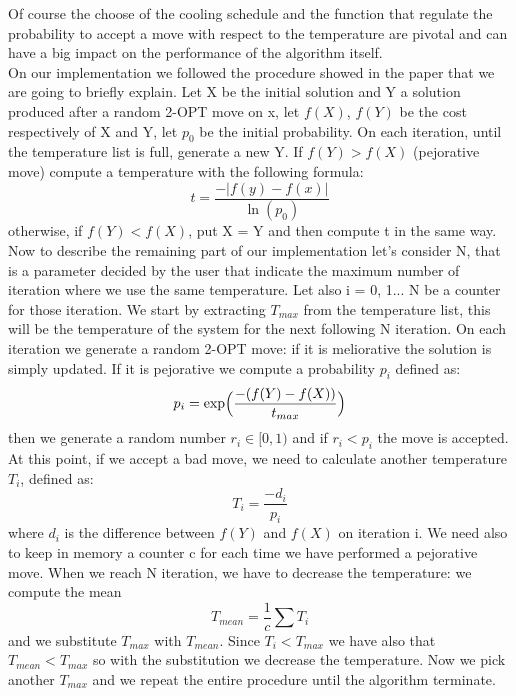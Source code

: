 \noindent Of course the choose of the cooling schedule and the function that regulate the probability to accept a move with respect to the temperature are pivotal and can have a big impact on the performance of the algorithm itself. \\
On our implementation we followed the procedure showed in the paper \cite{simAn} that we are going to briefly explain.
Let X be the initial solution and Y a solution produced after a random 2-OPT move on x, let $f(X)$, $f(Y)$ be the cost respectively of X and Y, let $p_0$ be the initial probability. On each iteration, until the temperature list is full, generate a new Y. If $f(Y) > f(X)$ (pejorative move) compute a temperature with the following formula:
\begin{equation*}
t = \frac{-\vert f(y) - f(x) \vert}{\ln{(p_0)}}
\end{equation*}
otherwise, if $f(Y) < f(X)$, put X = Y and then compute t in the same way.
Now to describe the remaining part of our implementation let's consider N, that is a parameter decided by the user that indicate the maximum number of iteration where we use the same temperature. Let also i = 0, 1... N be a counter for those iteration. We start by extracting $T_{max}$ from the temperature list, this will be the temperature of the system for the next following N iteration. On each iteration we generate a random 2-OPT move: if it is meliorative the solution is simply updated. If it is pejorative we compute a probability $p_i$ defined as:
\begin{equation*}
p_i = \exp \Bigl( \frac{-(f(Y)-f(X))}{t_{max}} \Bigr)
\end{equation*}
then we generate a random number $r_i \in [0, 1)$ and if $r_i < p_i$ the move is accepted.
At this point, if we accept a bad move, we need to calculate another temperature $T_i$, defined as:
\begin{equation*}
T_i = \frac{-d_i}{p_i}
\end{equation*} 
where $d_i$ is the difference between $f(Y)$ and $f(X)$ on iteration i. We need also to keep in memory a counter c for each time we have performed a pejorative move. When we reach N iteration, we have to decrease the temperature: we compute the mean
\begin{equation*}
T_{mean} = \frac{1}{c} \sum T_i
\end{equation*}
and we substitute $T_{max}$ with $T_{mean}$. Since $T_i < T_{max}$ we have also that $T_{mean} < T_{max}$ so with the substitution we decrease the temperature. Now we pick another $T_{max}$ and we repeat the entire procedure until the algorithm terminate.



